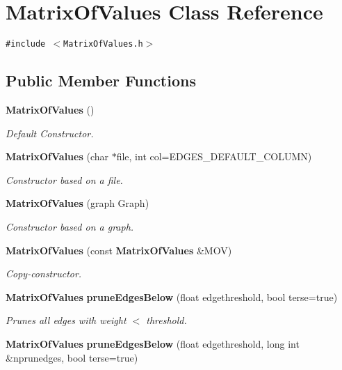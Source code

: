 \section{Matrix\-Of\-Values Class Reference}
\label{classMatrixOfValues}
{\tt \#include $<$Matrix\-Of\-Values.h$>$}

\subsection*{Public Member Functions}
\begin{CompactItemize}
\item 
{\bf Matrix\-Of\-Values} ()\label{classMatrixOfValues_a0}

\begin{CompactList}\small\item\em Default Constructor. \item\end{CompactList}\item 
{\bf Matrix\-Of\-Values} (char $\ast$file, int col=EDGES\_\-DEFAULT\_\-COLUMN)\label{classMatrixOfValues_a1}

\begin{CompactList}\small\item\em Constructor based on a file. \item\end{CompactList}\item 
{\bf Matrix\-Of\-Values} (graph Graph)\label{classMatrixOfValues_a2}

\begin{CompactList}\small\item\em Constructor based on a graph. \item\end{CompactList}\item 
{\bf Matrix\-Of\-Values} (const {\bf Matrix\-Of\-Values} \&MOV)\label{classMatrixOfValues_a3}

\begin{CompactList}\small\item\em Copy-constructor. \item\end{CompactList}\item 
{\bf Matrix\-Of\-Values} {\bf prune\-Edges\-Below} (float edgethreshold, bool terse=true)\label{classMatrixOfValues_a4}

\begin{CompactList}\small\item\em Prunes all edges with weight $<$ threshold. \item\end{CompactList}\item 
{\bf Matrix\-Of\-Values} {\bf prune\-Edges\-Below} (float edgethreshold, long int \&nprunedges, bool terse=true)\label{classMatrixOfValues_a5}


\end{CompactItemize}
